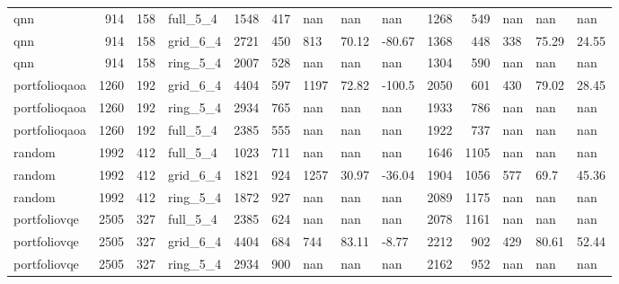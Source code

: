 \begin{longtable}{lrrlrrlllrrlll}
qnn & 914 & 158 & full\_5\_4 & 1548 & 417 & nan & nan & nan & 1268 & 549 & nan & nan & nan \\
qnn & 914 & 158 & grid\_6\_4 & 2721 & 450 & 813 & 70.12 & -80.67 & 1368 & 448 & 338 & 75.29 & 24.55 \\
qnn & 914 & 158 & ring\_5\_4 & 2007 & 528 & nan & nan & nan & 1304 & 590 & nan & nan & nan \\
portfolioqaoa & 1260 & 192 & grid\_6\_4 & 4404 & 597 & 1197 & 72.82 & -100.5 & 2050 & 601 & 430 & 79.02 & 28.45 \\
portfolioqaoa & 1260 & 192 & ring\_5\_4 & 2934 & 765 & nan & nan & nan & 1933 & 786 & nan & nan & nan \\
portfolioqaoa & 1260 & 192 & full\_5\_4 & 2385 & 555 & nan & nan & nan & 1922 & 737 & nan & nan & nan \\
random & 1992 & 412 & full\_5\_4 & 1023 & 711 & nan & nan & nan & 1646 & 1105 & nan & nan & nan \\
random & 1992 & 412 & grid\_6\_4 & 1821 & 924 & 1257 & 30.97 & -36.04 & 1904 & 1056 & 577 & 69.7 & 45.36 \\
random & 1992 & 412 & ring\_5\_4 & 1872 & 927 & nan & nan & nan & 2089 & 1175 & nan & nan & nan \\
portfoliovqe & 2505 & 327 & full\_5\_4 & 2385 & 624 & nan & nan & nan & 2078 & 1161 & nan & nan & nan \\
portfoliovqe & 2505 & 327 & grid\_6\_4 & 4404 & 684 & 744 & 83.11 & -8.77 & 2212 & 902 & 429 & 80.61 & 52.44 \\
portfoliovqe & 2505 & 327 & ring\_5\_4 & 2934 & 900 & nan & nan & nan & 2162 & 952 & nan & nan & nan \\
\end{longtable}
